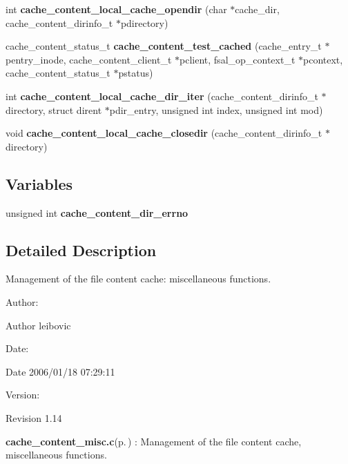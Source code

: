 \begin{CompactItemize}
\item 
int {\bf cache\_\-content\_\-local\_\-cache\_\-opendir} (char $\ast$cache\_\-dir, cache\_\-content\_\-dirinfo\_\-t $\ast$pdirectory)
\item 
cache\_\-content\_\-status\_\-t {\bf cache\_\-content\_\-test\_\-cached} (cache\_\-entry\_\-t $\ast$pentry\_\-inode, cache\_\-content\_\-client\_\-t $\ast$pclient, fsal\_\-op\_\-context\_\-t $\ast$pcontext, cache\_\-content\_\-status\_\-t $\ast$pstatus)
\item 
int {\bf cache\_\-content\_\-local\_\-cache\_\-dir\_\-iter} (cache\_\-content\_\-dirinfo\_\-t $\ast$directory, struct dirent $\ast$pdir\_\-entry, unsigned int index, unsigned int mod)
\item 
void {\bf cache\_\-content\_\-local\_\-cache\_\-closedir} (cache\_\-content\_\-dirinfo\_\-t $\ast$directory)
\end{CompactItemize}
\subsection*{Variables}
\begin{CompactItemize}
\item 
unsigned int {\bf cache\_\-content\_\-dir\_\-errno}
\end{CompactItemize}


\subsection{Detailed Description}
Management of the file content cache: miscellaneous functions. 

\begin{Desc}
\item[Author:]\begin{Desc}
\item[Author]leibovic \end{Desc}
\end{Desc}
\begin{Desc}
\item[Date:]\begin{Desc}
\item[Date]2006/01/18 07:29:11 \end{Desc}
\end{Desc}
\begin{Desc}
\item[Version:]\begin{Desc}
\item[Revision]1.14 \end{Desc}
\end{Desc}
{\bf cache\_\-content\_\-misc.c}{\rm (p.\,\pageref{cache__content__misc_8c})} : Management of the file content cache, miscellaneous functions.

